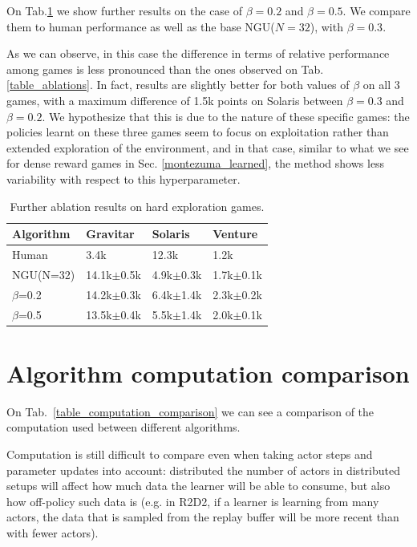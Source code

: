\documentclass{article} %
\begin{document}
On Tab.\ref{beta_results} we show further results on the case of $\beta=0.2$ and $\beta=0.5$. We compare them to human performance as well as the base NGU($N=32$), with $\beta=0.3$.

As we can observe, in this case the difference in terms of relative performance among games is less pronounced than the ones observed on Tab. \ref{table_ablations}. In fact, results are slightly better for both values of $\beta$ on all $3$ games, with a maximum difference of 1.5k points on Solaris between $\beta = 0.3$ and $\beta = 0.2$. We hypothesize that this is due to the nature of these specific games: the policies learnt on these three games seem to focus on exploitation rather than extended exploration of the environment, and in that case, similar to what we see for dense reward games in Sec. \ref{montezuma_learned}, the method shows less variability with respect to this hyperparameter.

\begin{table}
\scriptsize
\centering
\begin{tabular}{m{1.5cm}|m{3.0cm}m{3.0cm}m{3.0cm}}
Algorithm & Gravitar & Solaris & Venture \\ \hline
Human & 3.4k & 12.3k & 1.2k \\ \hline
NGU(N=32) & 14.1k$\pm$0.5k & 4.9k$\pm$0.3k & 1.7k$\pm$0.1k\\
$\beta$=0.2 & 14.2k$\pm$0.3k & 6.4k$\pm$1.4k & 2.3k$\pm$0.2k\\
$\beta$=0.5 & 13.5k$\pm$0.4k & 5.5k$\pm$1.4k & 2.0k$\pm$0.1k\\
\end{tabular}
\caption{Further ablation results on hard exploration games.}
\label{beta_results}
\vspace{-4ex}
\end{table}



\section{Algorithm computation comparison}
\label{computation_comparison}
On Tab.~\ref{table_computation_comparison} we can see a comparison of the computation used between different algorithms. 

Computation is still difficult to compare even when taking actor steps and parameter updates into account: distributed the number of actors in distributed setups will affect how much data the learner will be able to consume, but also how off-policy such data is (e.g. in R2D2, if a learner is learning from many actors, the data that is sampled from the replay buffer will be more recent than with fewer actors).
\end{document}
